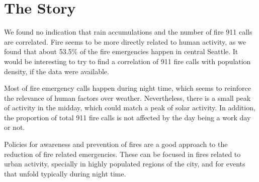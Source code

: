 \documentclass[12pt,a4paper]{article}
\begin{document}
\section{The Story}

We found no indication that rain accumulations and the number of fire 911 calls are correlated. Fire seems to be more directly related to human activity, as we found that about 53.5\% of the fire emergencies happen in central Seattle. It would be interesting to try to find a correlation of 911 fire calls with population density, if the data were available.

Most of fire emergency calls happen during night time, which seems to reinforce the relevance of human factors over weather. Nevertheless, there is a small peak of activity in the midday, which could match a peak of solar activity. In addition, the proportion of total 911 fire calls is not affected by the day being a work day or not.

Policies for awareness and prevention of fires are a good approach to the reduction of fire related emergencies. These can be focused in fires related to urban activity, specially in highly populated regions of the city, and for events that unfold typically during night time.






%

\end{document}
